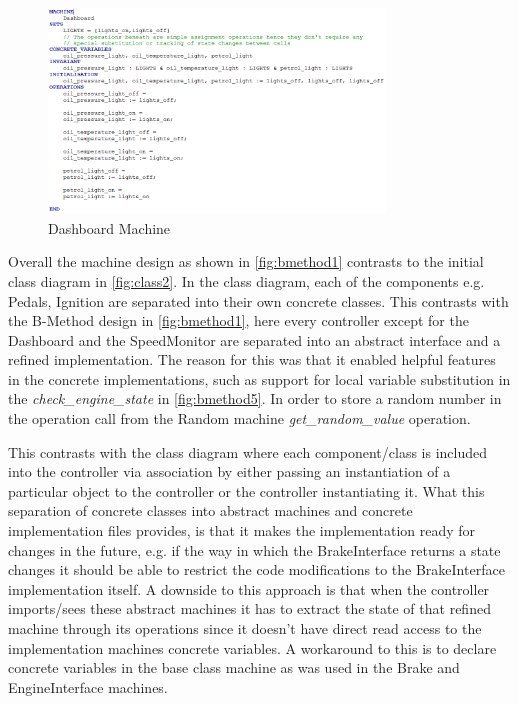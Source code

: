 \documentclass[12pt]{article}
\begin{document}
\begin{figure}
	\centering
	\includegraphics[width=0.8\textwidth]{dashboard_implementation}
	\caption{Dashboard Machine}
	\label{fig:bmethod9}
\end{figure}
Overall the machine design as shown in \ref{fig:bmethod1} contrasts to the initial class diagram in \ref{fig:class2}. In the class diagram, each of the components e.g. Pedals, Ignition are separated into their own concrete classes. This contrasts with the B-Method design in \ref{fig:bmethod1}, here every controller except for the Dashboard and the SpeedMonitor are separated into an abstract interface and a refined implementation. The reason for this was that it enabled helpful features in the concrete implementations, such as support for local variable substitution in the \textit{check\_engine\_state} in \ref{fig:bmethod5}. In order to store a random number in the operation call from the Random machine \textit{get\_random\_value} operation.

This contrasts with the class diagram where each component/class is included into the controller via association by either passing an instantiation of a particular object to the controller or the controller instantiating it. What this separation of concrete classes into abstract machines and concrete implementation files provides, is that it makes the implementation ready for changes in the future, e.g. if the way in which the BrakeInterface returns a state changes it should be able to restrict the code modifications to the BrakeInterface implementation itself. A downside to this approach is that when the controller imports/sees these abstract machines it has to extract the state of that refined machine through its operations since it doesn’t have direct read access to the implementation machines concrete variables. A workaround to this is to declare concrete variables in the base class machine as was used in the Brake and EngineInterface machines.
\end{document}

